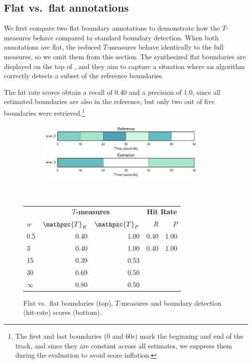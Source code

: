\documentclass{article}
\def\shag{\ensuremath{\mathpzc{T}}}
\begin{document}
\subsection{Flat vs.\ flat annotations}

We first compare two flat boundary annotations to demonstrate how the $T$-measures behave compared to 
standard boundary detection.
When both annotations are flat, the reduced $T$-measures behave identically to the full measures, so we omit
them from this section.
The synthesized flat boundaries are displayed on the top of , and they aim to capture a
situation where an algorithm correctly detects a subset of the reference boundaries.  

The hit rate scores obtain a recall of 0.40 and a precision of 1.0, since all estimated boundaries are also in the reference, but only two out of five boundaries were retrieved.\footnote{The first and last boundaries ($0$ and $60$s) mark the beginning and end of the track, and since they 
are constant across all estimates, we suppress them during the evaluation to avoid score inflation.}
\begin{figure}
  \centering
  \begin{subfigure}{\columnwidth}
    \centering
    \includegraphics[width=0.94\textwidth]{figs/flat-flat.pdf}
  \end{subfigure}%
  \\
  \vspace{-\baselineskip}
  \begin{minipage}{\columnwidth}
    \small
    \centering
    \vspace{10pt}
    \begin{tabular}{lrrrr}
      \toprule
      & \multicolumn{2}{c}{\textbf{$T$-measures}} & \multicolumn{2}{c}{\textbf{Hit Rate}} \\
      $w$ & $\shag_R$   & $\shag_P$ &  $R$     & $P$ \\
      \midrule
      0.5       & 0.40   & 1.00   & 0.40 & 1.00 \\
      3         & 0.40   & 1.00   & 0.40 & 1.00 \\
      15        & 0.39  & 0.53 \\
      30        & 0.69  & 0.50 \\
      $\infty$  & 0.80   & 0.50 \\
      \bottomrule
    \end{tabular}
  \end{minipage}
  \caption{Flat vs.\ flat boundaries (top), $T$-measures and boundary detection
    (hit-rate) scores (bottom).}\label{fig:flat-flat}
\end{figure}
\end{document}
